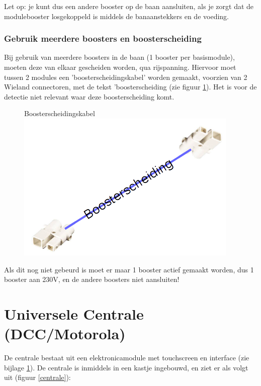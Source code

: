 \documentclass[12pt,a4paper]{report}
\begin{document}
Let op: je kunt dus een andere booster op de baan aansluiten, als je zorgt dat de modulebooster losgekoppeld is middels de banaanstekkers en de voeding.

\subsection{Gebruik meerdere boosters en boosterscheiding}
Bij gebruik van meerdere boosters in de baan (1 booster per basismodule), moeten deze van elkaar gescheiden worden, qua rijspanning. Hiervoor moet tussen 2 modules een 'boosterscheidingskabel' worden gemaakt, voorzien van 2 Wieland connectoren, met de tekst 'boosterscheiding (zie figuur \ref{im:boosterscheiding}). Het is voor de detectie niet relevant waar deze boosterscheiding komt.

\begin{figure}[!ht]
  \captionbox
  {Boosterscheidingskabel\label{im:boosterscheiding}}
  {\includegraphics[scale=1.0]{images/rcu_boosterscheiding}}\\
\end{figure}

Als dit nog niet gebeurd is moet er maar 1 booster actief gemaakt worden, dus 1 booster aan 230V, en  de andere boosters niet aansluiten!

\chapter{Universele Centrale (DCC/Motorola)}
\label{ch:centrale}
De centrale bestaat uit een elektronicamodule met touchscreen en interface (zie bijlage \ref{ch:centrale}). De centrale is inmiddels in een kastje ingebouwd, en ziet er als volgt uit (figuur \ref{centrale}):
\\
\end{document}
